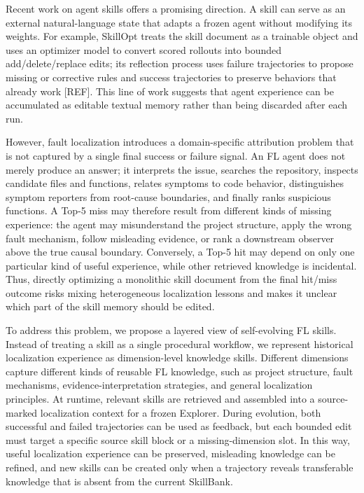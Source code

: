 Recent work on agent skills offers a promising direction. A skill can serve as an external natural-language state that adapts a frozen agent without modifying its weights. For example, SkillOpt treats the skill document as a trainable object and uses an optimizer model to convert scored rollouts into bounded add/delete/replace edits; its reflection process uses failure trajectories to propose missing or corrective rules and success trajectories to preserve behaviors that already work [REF]. This line of work suggests that agent experience can be accumulated as editable textual memory rather than being discarded after each run.

However, fault localization introduces a domain-specific attribution problem that is not captured by a single final success or failure signal. An FL agent does not merely produce an answer; it interprets the issue, searches the repository, inspects candidate files and functions, relates symptoms to code behavior, distinguishes symptom reporters from root-cause boundaries, and finally ranks suspicious functions. A Top-5 miss may therefore result from different kinds of missing experience: the agent may misunderstand the project structure, apply the wrong fault mechanism, follow misleading evidence, or rank a downstream observer above the true causal boundary. Conversely, a Top-5 hit may depend on only one particular kind of useful experience, while other retrieved knowledge is incidental. Thus, directly optimizing a monolithic skill document from the final hit/miss outcome risks mixing heterogeneous localization lessons and makes it unclear which part of the skill memory should be edited.

To address this problem, we propose a layered view of self-evolving FL skills. Instead of treating a skill as a single procedural workflow, we represent historical localization experience as dimension-level knowledge skills. Different dimensions capture different kinds of reusable FL knowledge, such as project structure, fault mechanisms, evidence-interpretation strategies, and general localization principles. At runtime, relevant skills are retrieved and assembled into a source-marked localization context for a frozen Explorer. During evolution, both successful and failed trajectories can be used as feedback, but each bounded edit must target a specific source skill block or a missing-dimension slot. In this way, useful localization experience can be preserved, misleading knowledge can be refined, and new skills can be created only when a trajectory reveals transferable knowledge that is absent from the current SkillBank.
